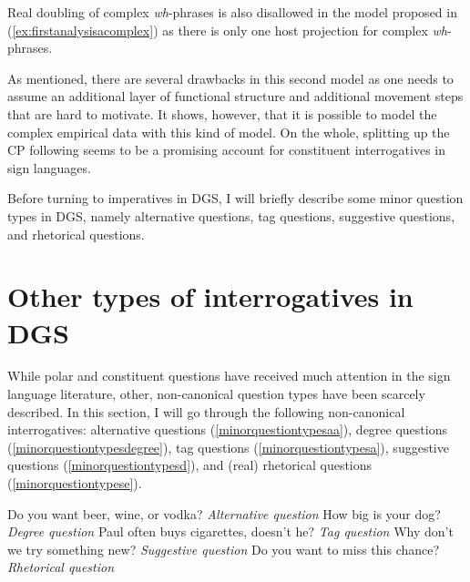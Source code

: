 \newpage 
\noindent Real doubling of complex \textit{wh}-phrases is also disallowed in the model proposed in (\ref{ex:firstanalysisacomplex}) as there is only one host projection for complex \textit{wh}-phrases. 

As mentioned, there are several drawbacks in this second model as one needs to assume an additional layer of functional structure and additional movement steps that are hard to motivate. It shows, however, that it is possible to model the complex empirical data with this kind of model. On the whole, splitting up the CP following \citet{van2010complex, van2012you} seems to be a promising account for constituent interrogatives in sign languages. 

Before turning to imperatives in DGS, I will briefly describe some minor question types in DGS, namely alternative questions, tag questions, suggestive questions, and rhetorical questions. 

\section{Other types of interrogatives in DGS}\label{otherinterr}
While polar and constituent questions have received much attention in the sign language literature, other, non-canonical question types have been scarcely described. In this section, I will go through the following non-canonical interrogatives: alternative questions  (\ref{minorquestiontypesaa}), degree questions (\ref{minorquestiontypesdegree}), tag questions (\ref{minorquestiontypesa}), suggestive questions (\ref{minorquestiontypesd}), and (real) rhetorical questions (\ref{minorquestiontypese}).%

\begin{exe}
\ex\label{minorquestiontypes}\begin{xlist}
\ex Do you want beer, wine, or vodka? \hfill{\textit{Alternative question}} \label{minorquestiontypesaa}
\ex How big is your dog? \hfill{\textit{Degree question}} \label{minorquestiontypesdegree}
\ex Paul often buys cigarettes, doesn't he? \hfill{\textit{Tag question}} \label{minorquestiontypesa}
\ex Why don't we try something new?  \hfill{\textit{Suggestive question}}  \label{minorquestiontypesd}
\ex Do you want to miss this chance? \hfill{\textit{Rhetorical question}} \label{minorquestiontypese}




\end{xlist}
\end{exe} 


